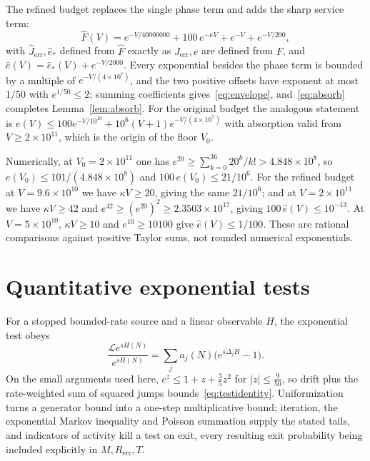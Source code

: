 \documentclass[11pt,a4paper]{article}
\theoremstyle{plain}
\theoremstyle{definition}
\theoremstyle{remark}
\newcommand{\Lgen}{\mathcal L}
\begin{document}
The refined budget replaces the single phase term and adds the sharp service term:
\[
\widehat F(V)=e^{-V/40000000}+100\,e^{-\kappa V}+e^{-V}+e^{-V/200},
\]
with $\widehat J_{\mathrm{err}},\widehat e_\ast$ defined from $\widehat F$ exactly as $J_{\mathrm{err}},e$ are defined from $F$, and $\widehat e(V)=\widehat e_\ast(V)+e^{-V/2000}$. Every exponential besides the phase term is bounded by a multiple of $e^{-V/(4\times10^{7})}$, and the two positive offsets have exponent at most $1/50$ with $e^{1/50}\le2$; summing coefficients gives~\eqref{eq:envelope}, and~\eqref{eq:absorb} completes Lemma~\ref{lem:absorb}. For the original budget the analogous statement is $e(V)\le100e^{-V/10^{10}}+10^{6}(V+1)e^{-V/(4\times10^{7})}$ with absorption valid from $V\ge2\times10^{11}$, which is the origin of the floor $V_0$.

Numerically, at $V_0=2\times10^{11}$ one has $e^{20}\ge\sum_{k=0}^{36}20^k/k!>4.848\times10^{8}$, so $e(V_0)\le101/(4.848\times10^{8})$ and $100\,e(V_0)\le21/10^{6}$. For the refined budget at $V=9.6\times10^{10}$ we have $\kappa V\ge20$, giving the same $21/10^{6}$; and at $V=2\times10^{11}$ we have $\kappa V\ge42$ and $e^{42}\ge(e^{20})^2\ge2.3503\times10^{17}$, giving $100\,\widehat e(V)\le10^{-13}$. At $V=5\times10^{10}$, $\kappa V\ge10$ and $e^{10}\ge10100$ give $\widehat e(V)\le1/100$. These are rational comparisons against positive Taylor sums, not rounded numerical exponentials.

\section{Quantitative exponential tests}\label{app:tests}

For a stopped bounded-rate source and a linear observable $H$, the exponential test obeys
\begin{equation}\label{eq:testidentity}
\frac{\Lgen e^{sH(N)}}{e^{sH(N)}}=\sum_ja_j(N)\bigl(e^{s\Delta_jH}-1\bigr).
\end{equation}
On the small arguments used here, $e^z\le1+z+\tfrac35z^2$ for $|z|\le\tfrac9{50}$, so drift plus the rate-weighted sum of squared jumps bounds~\eqref{eq:testidentity}. Uniformization turns a generator bound into a one-step multiplicative bound; iteration, the exponential Markov inequality and Poisson summation supply the stated tails, and indicators of activity kill a test on exit, every resulting exit probability being included explicitly in $M,R_{\mathrm{err}},T$.
\end{document}
